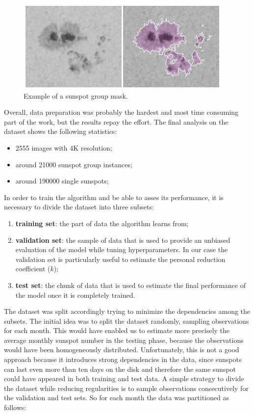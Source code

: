 \bigbreak
\begin{figure}[t!]
    \centering
    \includegraphics[width=\textwidth]{./pictures/blanquish}
    \caption{Example of a sunspot group mask.}
    \label{fig:annotated-sunspot}
\end{figure}
\noindent Overall, data preparation was probably the hardest and most time consuming part of the work, but the results repay the effort. The final analysis on the dataset shows the following statistics:
\begin{itemize}
  \item 2555 images with 4K resolution;
  \item around 21000 sunspot group instances;
  \item around 190000 single sunspots;
\end{itemize}
In order to train the algorithm and be able to asses its performance, it is necessary to divide the dataset into three subsets:
\begin{enumerate}
  \item \textbf{training set}: the part of data the algorithm learns from;
  \item \textbf{validation set}: the sample of data that is used to provide an unbiased evaluation of the model while tuning hyperparameters. In our case the validation set is particularly useful to estimate the personal reduction coefficient ($k$);
  \item \textbf{test set}: the chunk of data that is used to estimate the final performance of the model once it is completely trained.
\end{enumerate}
The dataset was split accordingly trying to minimize the dependencies among the subsets. The initial idea was to split the dataset randomly, sampling observations for each month. This would have enabled us to estimate more precisely the average monthly sunspot number in the testing phase, because the observations would have been homogeneously distributed. Unfortunately, this is not a good approach because it introduces strong dependencies in the data, since sunspots can last even more than ten days on the disk and therefore the same sunspot could have appeared in both training and test data. A simple strategy to divide the dataset while reducing regularities is to sample observations consecutively for the validation and test sets. So for each month the data was partitioned as follows:
